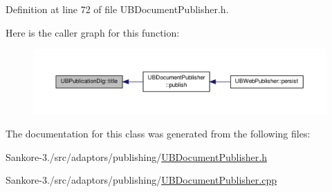Definition at line 72 of file U\-B\-Document\-Publisher.\-h.



Here is the caller graph for this function\-:
\nopagebreak
\begin{figure}[H]
\begin{center}
\leavevmode
\includegraphics[width=350pt]{d7/daf/class_u_b_publication_dlg_a79f81d1a7e514f34a8ae593cef4d1a9e_icgraph}
\end{center}
\end{figure}




The documentation for this class was generated from the following files\-:\begin{DoxyCompactItemize}
\item 
Sankore-\/3./src/adaptors/publishing/\hyperlink{_u_b_document_publisher_8h}{U\-B\-Document\-Publisher.\-h}\item 
Sankore-\/3./src/adaptors/publishing/\hyperlink{_u_b_document_publisher_8cpp}{U\-B\-Document\-Publisher.\-cpp}\end{DoxyCompactItemize}
